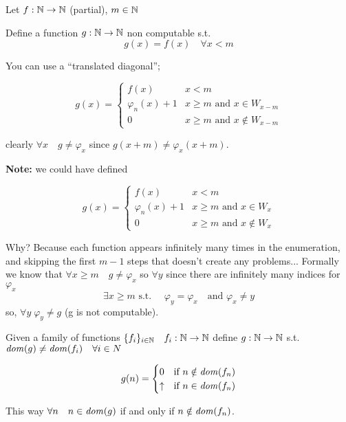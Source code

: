 \begin{exercise}
  Let $f: \mathbb{N} \rightarrow \mathbb{N}$ (partial), $m \in \mathbb{N}$

  Define a function $g : \mathbb{N} \rightarrow \mathbb{N}$ non computable
  s.t. \[g(x) = f(x) \quad \forall x < m\]

  You can use a ``translated diagonal'';


  \[
    g(x) = \begin{cases}
      f(x) & x < m \\
      \varphi_n(x) + 1 & x \geq m \mbox{ and } x \in W_{x-m} \\
      0 & x \geq m \mbox{ and } x \notin W_{x-m}
    \end{cases}
  \]

  clearly $\forall x \quad g\neq \varphi_x$ since
  $g(x + m) \neq \varphi_x(x+m)$.

  \textbf{Note:} we could have defined

  \[
    g(x) = \begin{cases}
      f(x) & x < m \\
      \varphi_n(x) + 1 & x \geq m \mbox{ and } x \in W_{x} \\
      0 & x \geq m \mbox{ and } x \notin W_{x}
    \end{cases}
  \]

  Why? Because each function appears infinitely many times in the enumeration,
  and skipping the first $m-1$ steps that doesn't create any
  problems... Formally we know that
  $\forall x \geq m \quad g \neq \varphi_x$ so $\forall y$ since there
  are infinitely many indices for $\varphi_x$
  \[\exists x \geq m \mbox{ s.t. } \quad \varphi_y = \varphi_x \quad
    \mbox{and } \varphi_x \neq y\] so, $\forall y \; \varphi_y \neq g$
  (g is not computable).
\end{exercise}

\begin{exercise}
  Given a family of functions
  $\{f_i\}_{i\in \mathbb{N}} \quad f_i : \mathbb{N} \rightarrow \mathbb{N}$ define $g: \mathbb{N} \rightarrow \mathbb{N}$
  s.t. $\mathit{dom}({g}) \neq \mathit{dom}({f_i}) \quad \forall i \in N$

  \[
    g(n) = \begin{cases}
      0 & \mbox{if } n \notin \mathit{dom}({f_n}) \\
      \uparrow & \mbox{if } n \in \mathit{dom}({f_n})
    \end{cases}
  \]

  This way $\forall n \quad n \in \mathit{dom}({g})$ if and only if
  $n \notin \mathit{dom}({f_n})$.
\end{exercise}

